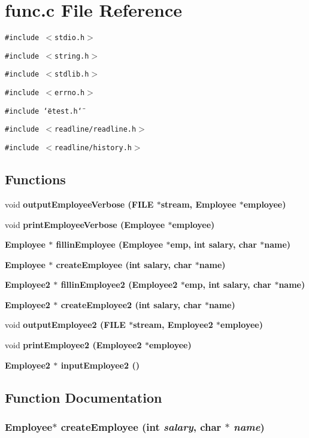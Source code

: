 \section{func.c File Reference}
\label{func_8c}
{\tt \#include $<$stdio.h$>$}\par
{\tt \#include $<$string.h$>$}\par
{\tt \#include $<$stdlib.h$>$}\par
{\tt \#include $<$errno.h$>$}\par
{\tt \#include \char`\"{}etest.h\char`\"{}}\par
{\tt \#include $<$readline/readline.h$>$}\par
{\tt \#include $<$readline/history.h$>$}\par
\subsection*{Functions}
\begin{CompactItemize}
\item 
void \bf{output\-Employee\-Verbose} (FILE $\ast$stream, \bf{Employee} $\ast$employee)
\item 
void \bf{print\-Employee\-Verbose} (\bf{Employee} $\ast$employee)
\item 
\bf{Employee} $\ast$ \bf{fillin\-Employee} (\bf{Employee} $\ast$emp, int salary, char $\ast$name)
\item 
\bf{Employee} $\ast$ \bf{create\-Employee} (int salary, char $\ast$name)
\item 
\bf{Employee2} $\ast$ \bf{fillin\-Employee2} (\bf{Employee2} $\ast$emp, int salary, char $\ast$name)
\item 
\bf{Employee2} $\ast$ \bf{create\-Employee2} (int salary, char $\ast$name)
\item 
void \bf{output\-Employee2} (FILE $\ast$stream, \bf{Employee2} $\ast$employee)
\item 
void \bf{print\-Employee2} (\bf{Employee2} $\ast$employee)
\item 
\bf{Employee2} $\ast$ \bf{input\-Employee2} ()
\end{CompactItemize}


\subsection{Function Documentation}
\subsubsection{\setlength{\rightskip}{0pt plus 5cm}\bf{Employee}$\ast$ create\-Employee (int {\em salary}, char $\ast$ {\em name})}\label{func_8c_eb7cb4c5c4779c2113e3daf270db2345}


